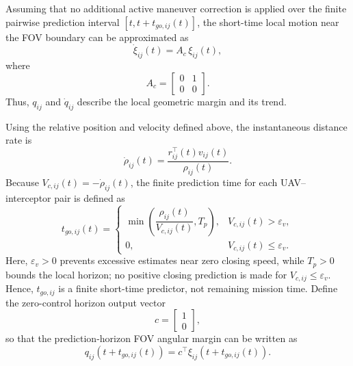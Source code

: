 \documentclass{cja}
\begin{document}
Assuming that no additional active maneuver correction is applied over the finite pairwise prediction interval $[t,t+t_{go,ij}(t)]$, the short-time local motion near the FOV boundary can be approximated as
\begin{equation}
\dot \xi_{ij}(t)
=
A_{c}\,\xi_{ij}(t),
\end{equation}
where
\begin{equation}
A_{c}
=
\begin{bmatrix}
0 & 1\\
0 & 0
\end{bmatrix}.
\end{equation}
Thus, $q_{ij}$ and $\dot q_{ij}$ describe the local geometric margin and its trend.

Using the relative position and velocity defined above, the instantaneous distance rate is
\begin{equation}
\dot\rho_{ij}(t)
=
\frac{r_{ij}^{\top}(t)v_{ij}(t)}{\rho_{ij}(t)}.
\end{equation}
Because $V_{c,ij}(t)=-\dot\rho_{ij}(t)$, the finite prediction time for each UAV--interceptor pair is defined as
\begin{equation}
t_{go,ij}(t)
=
\begin{cases}
\displaystyle
\min\!\left(
\dfrac{\rho_{ij}(t)}{V_{c,ij}(t)},
T_p
\right),
& V_{c,ij}(t)>\varepsilon_v,\\[3mm]
0,
& V_{c,ij}(t)\le\varepsilon_v.
\end{cases}
\end{equation}
Here, $\varepsilon_v>0$ prevents excessive estimates near zero closing speed, while $T_p>0$ bounds the local horizon; no positive closing prediction is made for $V_{c,ij}\le\varepsilon_v$. Hence, $t_{go,ij}$ is a finite short-time predictor, not remaining mission time. Define the zero-control horizon output vector
\begin{equation}
c=
\begin{bmatrix}
1\\
0
\end{bmatrix},
\end{equation}
so that the prediction-horizon FOV angular margin can be written as
\begin{equation}
q_{ij}\!\left(t+t_{go,ij}(t)\right)=c^{\top}\xi_{ij}\!\left(t+t_{go,ij}(t)\right).
\end{equation}
\end{document}
